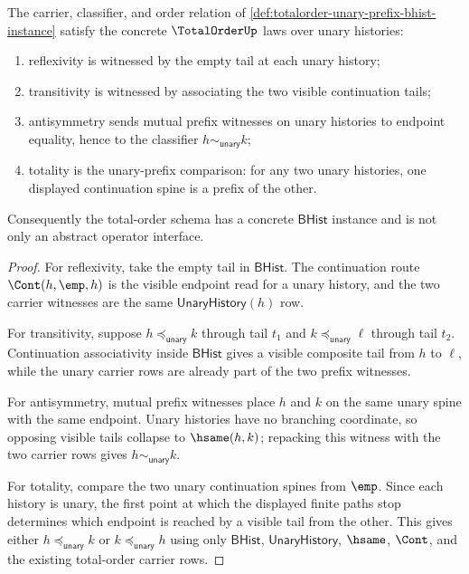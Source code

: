 \begin{theorem}
\label{thm:totalorder-unary-prefix-bhist-laws}
The carrier, classifier, and order relation of
\autoref{def:totalorder-unary-prefix-bhist-instance} satisfy the concrete
$\TotalOrderUp$ laws over unary histories:
\begin{enumerate}
\item reflexivity is witnessed by the empty tail at each unary history;
\item transitivity is witnessed by associating the two visible continuation
tails;
\item antisymmetry sends mutual prefix witnesses on unary histories to endpoint
equality, hence to the classifier $h\sim_{\mathsf{unary}}k$;
\item totality is the unary-prefix comparison: for any two unary histories,
one displayed continuation spine is a prefix of the other.
\end{enumerate}
Consequently the total-order schema has a concrete $\mathsf{BHist}$ instance
and is not only an abstract operator interface.
\end{theorem}
\begin{proof}
For reflexivity, take the empty tail in $\mathsf{BHist}$. The continuation
route $\Cont(h,\emp,h)$ is the visible endpoint read for a unary history, and
the two carrier witnesses are the same $\mathsf{UnaryHistory}(h)$ row.

For transitivity, suppose $h\preceq_{\mathsf{unary}}k$ through tail $t_1$ and
$k\preceq_{\mathsf{unary}}\ell$ through tail $t_2$. Continuation associativity
inside $\mathsf{BHist}$ gives a visible composite tail from $h$ to $\ell$, while
the unary carrier rows are already part of the two prefix witnesses.

For antisymmetry, mutual prefix witnesses place $h$ and $k$ on the same unary
spine with the same endpoint. Unary histories have no branching coordinate, so
opposing visible tails collapse to $\hsame(h,k)$; repacking this witness with
the two carrier rows gives $h\sim_{\mathsf{unary}}k$.

For totality, compare the two unary continuation spines from $\emp$. Since each
history is unary, the first point at which the displayed finite paths stop
determines which endpoint is reached by a visible tail from the other. This
gives either $h\preceq_{\mathsf{unary}}k$ or
$k\preceq_{\mathsf{unary}}h$ using only $\mathsf{BHist}$,
$\mathsf{UnaryHistory}$, $\hsame$, $\Cont$, and the existing total-order carrier
rows.
\end{proof}
